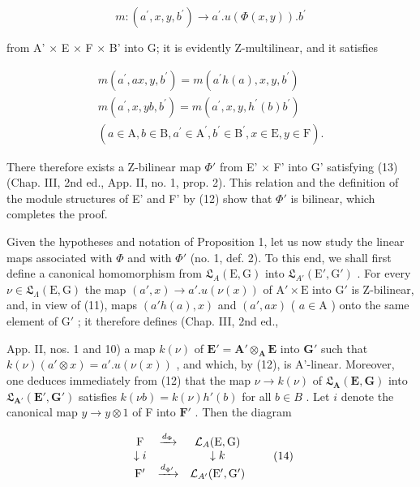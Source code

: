 \[
m: (a ^ {\prime}, x, y, b ^ {\prime}) \rightarrow a ^ {\prime}. u (\Phi (x, y)). b ^ {\prime}
\]

from A' × E × F × B' into G; it is evidently Z-multilinear, and it satisfies

\[
\begin{array}{r} m (a ^ {\prime}, a x, y, b ^ {\prime}) = m (a ^ {\prime} h (a), x, y, b ^ {\prime}) \\ m (a ^ {\prime}, x, y b, b ^ {\prime}) = m (a ^ {\prime}, x, y, h ^ {\prime} (b) b ^ {\prime}) \\ (a \in \mathrm{A}, b \in \mathrm{B}, a ^ {\prime} \in \mathrm{A} ^ {\prime}, b ^ {\prime} \in \mathrm{B} ^ {\prime}, x \in \mathrm{E}, y \in \mathrm{F}). \end{array}
\]

There therefore exists a Z-bilinear map \(\Phi'\) from E' × F' into G' satisfying (13) (Chap. III, 2nd ed., App. II, no. 1, prop. 2). This relation and the definition of the module structures of E' and F' by (12) show that \(\Phi'\) is bilinear, which completes the proof.

Given the hypotheses and notation of Proposition 1, let us now study the linear maps associated with \(\Phi\) and with \(\Phi'\) (no. 1, def. 2). To this end, we shall first define a canonical homomorphism from \(\mathfrak{L}_{A}(\mathrm{E}, \mathrm{G})\) into \(\mathfrak{L}_{A'}(\mathrm{E}', \mathrm{G}')\) . For every \(\nu \in \mathfrak{L}_{\Lambda}(\mathrm{E}, \mathrm{G})\) the map \((a', x) \to a'. u(\nu(x))\) of \(\mathrm{A}' \times \mathrm{E}\) into \(\mathrm{G}'\) is Z-bilinear, and, in view of (11), maps \((a'h(a), x)\) and \((a', ax)\) ( \(a \in \mathrm{A}\) ) onto the same element of \(\mathrm{G}'\) ; it therefore defines (Chap. III, 2nd ed.,

App. II, nos. 1 and 10) a map \(k(\nu)\) of \(\mathbf{E}' = \mathbf{A}' \otimes_{\mathbf{A}} \mathbf{E}\) into \(\mathbf{G}'\) such that \(k(\nu)(a' \otimes x) = a'. u(\nu(x))\) , and which, by (12), is A'-linear. Moreover, one deduces immediately from (12) that the map \(\nu \to k(\nu)\) of \(\mathfrak{L}_{\mathbf{A}}(\mathbf{E}, \mathbf{G})\) into \(\mathfrak{L}_{\mathbf{A}'}(\mathbf{E}', \mathbf{G}')\) satisfies \(k(\nu b) = k(\nu) h'(b)\) for all \(b \in B\) . Let \(i\) denote the canonical map \(y \to y \otimes 1\) of F into \(\mathbf{F}'\) . Then the diagram

\[
\begin{array}{c c c} \mathrm{F} & \xrightarrow {d _ {\Phi}} & \mathcal {L} _ {A} (\mathrm{E}, \mathrm{G}) \\ \downarrow i & & \downarrow k \\ \mathrm{F} ^ {\prime} & \xrightarrow {d _ {\Phi^ {\prime}}} & \mathcal {L} _ {A^{\prime}} (\mathrm{E} ^ {\prime}, \mathrm{G} ^ {\prime}) \end{array}\tag{14}
\]

